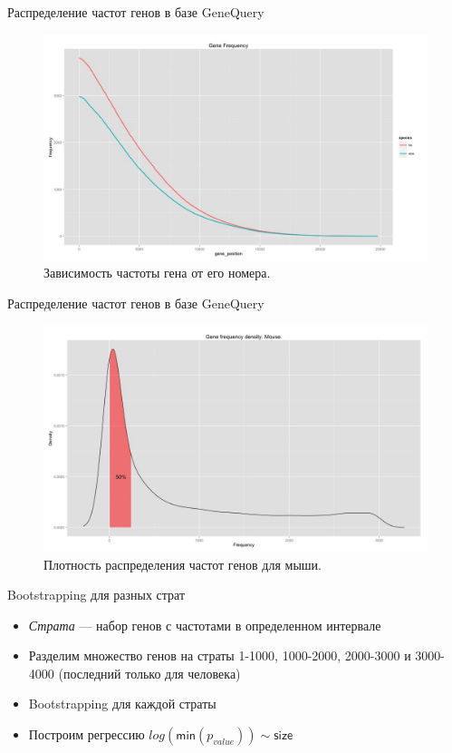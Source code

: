 \documentclass[10pt,pdf,utf8,russian,aspectratio=169]{beamer}
\begin{document}
\begin{frame}{Распределение частот генов в базе GeneQuery}
    \begin{figure}[p]
        \centering
        \caption{Зависимость частоты гена от его номера.}
        \includegraphics[height=0.8\textheight]{./img/gene_position_to_freq.jpeg}
    \end{figure}
\end{frame}

\begin{frame}{Распределение частот генов в базе GeneQuery}
    \begin{figure}[p]
        \centering
        \caption{Плотность распределения частот генов для мыши.}
        \includegraphics[height=0.8\textheight]{./img/gene_freq_density_mm.jpeg}
    \end{figure}
\end{frame}

\begin{frame}{Bootstrapping для разных страт}
    \begin{itemize}[<+->]
	    \item \emph{Страта} --- набор генов с частотами в определенном интервале
	    \item Разделим множество генов на страты 1-1000, 1000-2000, 2000-3000 и 3000-4000 (последний только для человека)
	    \item Bootstrapping для каждой страты
	    \item Построим регрессию $log(\mathsf{min}(p_{value})) \sim \mathsf{size}$
	 \end{itemize}
\end{frame}
\end{document}
